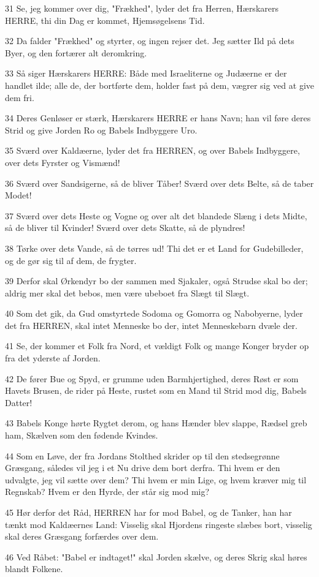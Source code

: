 \par 31 Se, jeg kommer over dig, "Frækhed", lyder det fra Herren, Hærskarers HERRE, thi din Dag er kommet, Hjemsøgelsens Tid.
\par 32 Da falder "Frækhed" og styrter, og ingen rejser det. Jeg sætter Ild på dets Byer, og den fortærer alt deromkring.
\par 33 Så siger Hærskarers HERRE: Både med Israeliterne og Judæerne er der handlet ilde; alle de, der bortførte dem, holder fast på dem, vægrer sig ved at give dem fri.
\par 34 Deres Genløser er stærk, Hærskarers HERRE er hans Navn; han vil føre deres Strid og give Jorden Ro og Babels Indbyggere Uro.
\par 35 Sværd over Kaldæerne, lyder det fra HERREN, og over Babels Indbyggere, over dets Fyrster og Vismænd!
\par 36 Sværd over Sandsigerne, så de bliver Tåber! Sværd over dets Belte, så de taber Modet!
\par 37 Sværd over dets Heste og Vogne og over alt det blandede Slæng i dets Midte, så de bliver til Kvinder! Sværd over dets Skatte, så de plyndres!
\par 38 Tørke over dets Vande, så de tørres ud! Thi det er et Land for Gudebilleder, og de gør sig til af dem, de frygter.
\par 39 Derfor skal Ørkendyr bo der sammen med Sjakaler, også Strudse skal bo der; aldrig mer skal det bebos, men være ubeboet fra Slægt til Slægt.
\par 40 Som det gik, da Gud omstyrtede Sodoma og Gomorra og Nabobyerne, lyder det fra HERREN, skal intet Menneske bo der, intet Menneskebarn dvæle der.
\par 41 Se, der kommer et Folk fra Nord, et vældigt Folk og mange Konger bryder op fra det yderste af Jorden.
\par 42 De fører Bue og Spyd, er grumme uden Barmhjertighed, deres Røst er som Havets Brusen, de rider på Heste, rustet som en Mand til Strid mod dig, Babels Datter!
\par 43 Babels Konge hørte Rygtet derom, og hans Hænder blev slappe, Rædsel greb ham, Skælven som den fødende Kvindes.
\par 44 Som en Løve, der fra Jordans Stolthed skrider op til den stedsegrønne Græsgang, således vil jeg i et Nu drive dem bort derfra. Thi hvem er den udvalgte, jeg vil sætte over dem? Thi hvem er min Lige, og hvem kræver mig til Regnskab? Hvem er den Hyrde, der står sig mod mig?
\par 45 Hør derfor det Råd, HERREN har for mod Babel, og de Tanker, han har tænkt mod Kaldæernes Land: Visselig skal Hjordens ringeste slæbes bort, visselig skal deres Græsgang forfærdes over dem.
\par 46 Ved Råbet: "Babel er indtaget!" skal Jorden skælve, og deres Skrig skal høres blandt Folkene.

